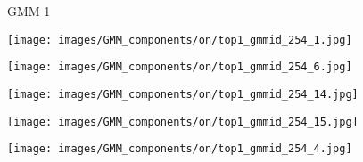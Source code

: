 \documentclass[10pt,twocolumn,letterpaper]{article}
\begin{document}
\begin{figure*}[t]
\centering
\begin{minipage}[b]{0.005\textwidth}
    	\centering
    	\begin{turn}{90}
    GMM 1
    	\end{turn}
    	\vspace{2ex}
    \end{minipage}
    \hspace{0.01\textwidth}
    \begin{minipage}[b]{0.18\textwidth}
    	\centering
       	\texttt{[image: images/GMM\_components/on/top1\_gmmid\_254\_1.jpg]}
    \end{minipage}
    \hspace{0.005\textwidth}
    \begin{minipage}[b]{0.18\textwidth}
    	\centering
       	\texttt{[image: images/GMM\_components/on/top1\_gmmid\_254\_6.jpg]}
    \end{minipage}
    \hspace{0.005\textwidth}
    \begin{minipage}[b]{0.18\textwidth}
    	\centering
       	\texttt{[image: images/GMM\_components/on/top1\_gmmid\_254\_14.jpg]}
    \end{minipage}
    \hspace{0.005\textwidth}
	\begin{minipage}[b]{0.18\textwidth}
    	\centering
       	\texttt{[image: images/GMM\_components/on/top1\_gmmid\_254\_15.jpg]}
    \end{minipage}
    \hspace{0.005\textwidth}
    \begin{minipage}[b]{0.18\textwidth}
    	\centering
       	\texttt{[image: images/GMM\_components/on/top1\_gmmid\_254\_4.jpg]}
    \end{minipage} 
	   

\end{figure*}
\end{document}
